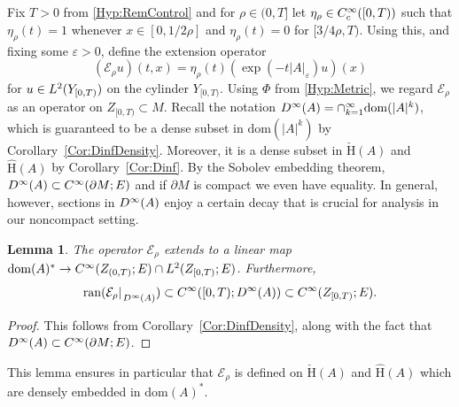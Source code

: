 \documentclass[a4paper,10pt,reqno]{amsart}
\newcommand{\rest}[1]{{{\lvert_{}}_{}}_{#1}}
\newcommand{\modulus}[1]{|#1|}
\newcommand{\Lp}[2][{}]{{\rm L}^{#2}_{\rm #1}}%
\newcommand{\Ck}[2][{}]{{\rm C}^{#2}_{\rm #1}}%
\newcommand{\Dk}[2][{}]{{\rm D}^{#2}_{\rm #1}}%
\newcommand{\checkH}{\check{\mathrm{H}}}
\newcommand{\hatH}{\hat{\mathrm{H}}}
\newcommand{\ran}{\mathrm{ran}}
\newcommand{\dom}{\mathrm{dom}}
\newcommand{\ext}{\mathcal{E}}
\renewcommand{\epsilon}{\varepsilon}
\newcommand{\dM}{\partial M}
\newtheorem{lemma}[theorem]{Lemma}
\theoremstyle{definition}
\begin{document}
Fix $T > 0$ from \ref{Hyp:RemControl} and for $\rho \in (0,T]$ let $\eta_\rho \in \Ck[c]{\infty}([0,T))$ such that $\eta_\rho(t) = 1$ whenever $x \in [0, 1/2\rho]$ and  $\eta_\rho(t) = 0$ for $[3/4\rho, T)$.
Using this, and fixing some $\epsilon > 0$, define the extension operator
\begin{equation}
(\ext_\rho u)(t,x) = \eta_\rho(t) (\exp(-t\modulus{A}_\epsilon) u)(x)
\end{equation}
for $u \in \Lp{2}(Y_{[0,T)})$ on the cylinder $Y_{[0,T)}$.
Using $\Phi$ from \ref{Hyp:Metric}, we regard $\ext_\rho$ as an operator on $Z_{[0,T)}\subset M$.
Recall the notation $\Dk{\infty}(A) = \cap_{k =1}^\infty \dom(\modulus{A}^k)$, which is guaranteed to be a dense subset in $\dom(\modulus{A}^k)$ by Corollary~\ref{Cor:DinfDensity}.
Moreover, it is a dense subset in $\checkH(A)$ and $\hatH(A)$ by Corollary~\ref{Cor:Dinf}.
By the Sobolev embedding theorem, $\Dk{\infty}(A) \subset \Ck{\infty}(\dM;E)$ and if $\dM$ is compact we even have equality.
In general, however, sections in $\Dk{\infty}(A)$ enjoy a certain decay that is crucial for analysis in our noncompact setting.

\begin{lemma}
\label{Lem:ExpReg}
The operator $\ext_\rho$ extends to a linear map $\dom(A)^\ast \to \Ck{\infty}(Z_{(0,T)};E) \cap \Lp{2}(Z_{[0,T)};E)$.
Furthermore,
$$ \ran(\ext_\rho\rest{\Dk{\infty}(A)}) \subset \Ck{\infty}([0,T); \Dk{\infty}(A)) \subset \Ck{\infty}(Z_{[0,T)};E).$$
\end{lemma}
\begin{proof}
This follows from Corollary~\ref{Cor:DinfDensity}, along with the fact that $\Dk{\infty}(A) \subset \Ck{\infty}(\dM;E)$.
\end{proof}

This lemma ensures in particular that $\ext_\rho$ is defined on $\checkH(A)$ and $\hatH(A)$ which are densely embedded in $\dom(A)^\ast$.
\end{document}

